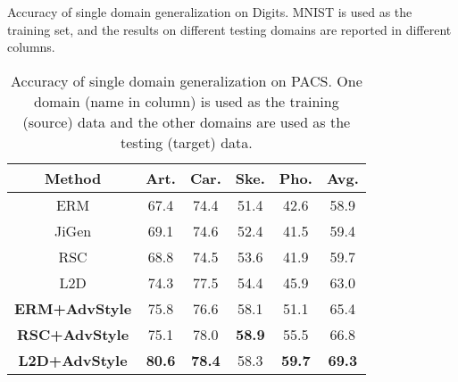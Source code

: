 \documentclass{article}
\begin{document}
\begin{table}[t]
\begin{minipage}{0.5\linewidth}  
\centering
\caption{Accuracy of single domain generalization on Digits. MNIST is used as the training set, and the results on different testing domains are reported in different columns.}
\setlength{\tabcolsep}{2pt}
\footnotesize
{}
\label{tab:digits}
\end{minipage}
\hspace{0.5cm}
\begin{minipage}{0.45\linewidth}  
\footnotesize
    \setlength{\tabcolsep}{2.8pt}
    \centering
    \caption{Accuracy of single domain generalization on PACS. One domain (name in column) is used as the training (source) data and the other domains are used as the testing (target) data.}
    \begin{tabular}{c|cccc|c}
    \toprule
         Method & Art. & Car.& Ske. & Pho. & Avg.  \\
         \midrule
         ERM& 67.4 & 74.4 &51.4&42.6&58.9\\
         JiGen& 69.1& 74.6 & 52.4& 41.5&59.4\\
         RSC& 68.8 &74.5 &53.6 &41.9 & 59.7\\
         L2D&74.3&77.5&54.4&45.9&63.0\\
         \midrule
         \bf ERM+AdvStyle & {75.8} & 76.6 & 58.1& 51.1 &65.4\\
         \bf RSC+AdvStyle & 75.1& {78.0} & \textbf{58.9} & {55.5} & 66.8\\
         \bf L2D+AdvStyle & \bf 80.6& \textbf{78.4} & {58.3} & \textbf{59.7} & \bf 69.3\\
    \bottomrule
    \end{tabular}
\label{tab:pacs}
\end{minipage}
\end{table}
\end{document}
